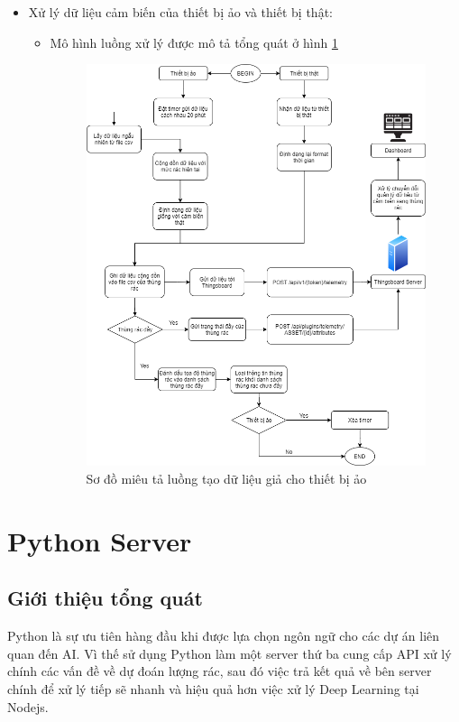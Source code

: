 \begin{itemize}
    \item Xử lý dữ liệu cảm biến của thiết bị ảo và thiết bị thật:
    \begin{itemize}  
            \item Mô hình luồng xử lý được mô tả tổng quát ở hình \ref{fig:random_telemetry}
            \begin{figure}[H]
                \centering
                \includegraphics[width=\textwidth]{images/Khanh/Nodejs/Server_Random_Telemetry.png}
                \caption{Sơ đồ miêu tả luồng tạo dữ liệu giả cho thiết bị ảo}
                \label{fig:random_telemetry}
            \end{figure}

    \end{itemize}

\end{itemize}

\section{Python Server}
\subsection{Giới thiệu tổng quát}
Python là sự ưu tiên hàng đầu khi được lựa chọn ngôn ngữ cho các dự án liên quan đến AI. Vì thế sử dụng Python làm một server thứ ba cung cấp API xử lý chính các vấn đề về dự đoán lượng rác, sau đó việc trả kết quả về bên server chính để xử lý tiếp sẽ nhanh và hiệu quả hơn việc xử lý Deep Learning tại Nodejs.

